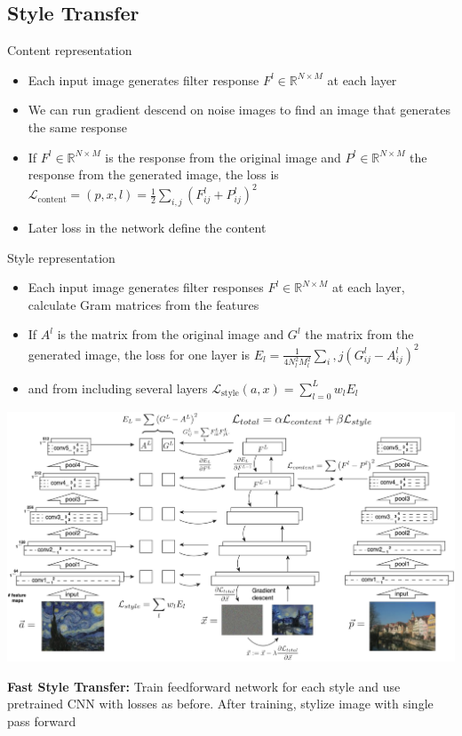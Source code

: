 \subsection{Style Transfer}
\begin{minipage}{0.5\textwidth}
    Content representation
    \begin{itemize}
        \item Each input image generates filter response \newline $F^l \in \mathbb{R}^{N \times M}$ at each layer
        \item We can run gradient descend on noise images to find an image that generates the same response
        \item If $F^l \in \mathbb{R}^{N \times M}$ is the response from the original image and $P^l \in \mathbb{R}^{N \times M}$ the response from the generated image, the loss is $\mathcal{L}_\text{content}=(p,x,l)=\frac{1}{2}\sum_{i,j}\left(F_{ij}^l + P_{ij}^l\right)^2$
        \item Later loss in the network define the content
    \end{itemize}
\end{minipage}
\begin{minipage}{0.5\textwidth}
    Style representation
    \begin{itemize}
        \item Each input image generates filter responses $F^l \in \mathbb{R}^{N \times M}$ at each layer, calculate Gram matrices from the features
        \item If $A^l$ is the matrix from the original image and $G^l$ the matrix from the generated image, the loss for one layer is \newline $E_l = \frac{1}{4N_l^2M_l^2}\sum_i,j \left(G_{ij}^l - A_{ij}^l\right)^2$
        \item and from including several layers \newline $\mathcal{L}_\text{style}(a,x) = \sum_{l=0}^L w_l E_l$
    \end{itemize}
\end{minipage}
\includegraphics[width=1\textwidth]{sections/GeneratingImages/img/style_transfer.png}

\textbf{Fast Style Transfer:} Train feedforward network for each style and use pretrained CNN with losses as before.
After training, stylize image with single pass forward